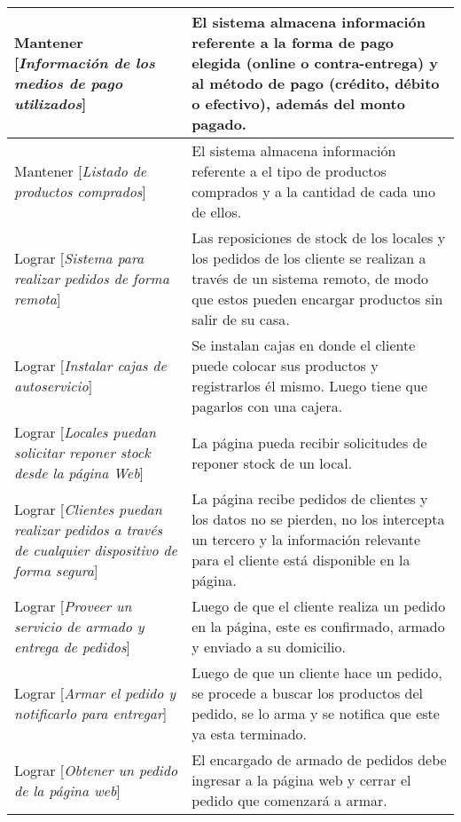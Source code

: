\begin{center}
\begin{longtable}{p{7cm} p{7cm}}
Mantener [\textit{Información de los medios de pago utilizados}] & El sistema almacena información referente a la forma de pago elegida (online o contra-entrega) y al método de pago (crédito, débito o efectivo), además del monto pagado. \\[0.2em] \hline

Mantener [\textit{Listado de productos comprados}] & El sistema almacena información referente a el tipo de productos comprados y a la cantidad de cada uno de ellos. \\[0.2em] \hline

Lograr [\textit{Sistema para realizar pedidos de forma remota}] & Las reposiciones de stock de los locales y los pedidos de los cliente se realizan a través de un sistema remoto, de modo que estos pueden encargar productos sin salir de su casa. \\[0.2em] \hline

Lograr [\textit{Instalar cajas de autoservicio}] & Se instalan cajas en donde el cliente puede colocar sus productos y registrarlos él mismo. Luego tiene que pagarlos con una cajera. \\[0.2em] \hline

Lograr [\textit{Locales puedan solicitar reponer stock desde la página Web}] & La página pueda recibir solicitudes de reponer stock de un local. \\[0.2em] \hline

Lograr [\textit{Clientes puedan realizar pedidos a través de cualquier dispositivo de forma segura}] & La página recibe pedidos de clientes y los datos no se pierden, no los intercepta un tercero y la información relevante para el cliente está disponible en la página. \\[0.2em] \hline

Lograr [\textit{Proveer un servicio de armado y entrega de pedidos}] & Luego de que el cliente realiza un pedido en la página, este es confirmado, armado y enviado a su domicilio. \\[0.2em] \hline

Lograr [\textit{Armar el pedido y notificarlo para entregar}] & Luego de que un cliente hace un pedido, se procede a buscar los productos del pedido, se lo arma y se notifica que este ya esta terminado. \\[0.2em] \hline

Lograr [\textit{Obtener un pedido de la página web}] & El encargado de armado de pedidos debe ingresar a la página web y cerrar el pedido que comenzará a armar. \\[0.2em] \hline


\end{longtable}
\end{center}
